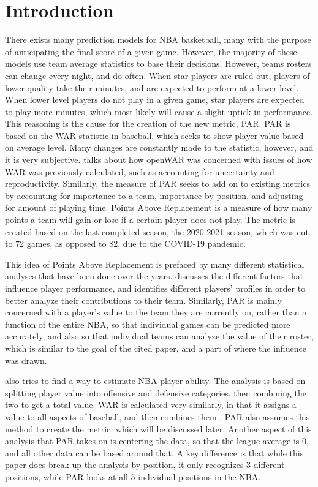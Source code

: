 \documentclass[12pt]{article}
\begin{document}
\section{Introduction}
There exists many prediction models for NBA basketball, many with the 
purpose of anticipating the final 
score of a given game. However, the majority of these models use team 
average statistics to base their 
decisions. However, 
teams rosters can change every night, and do often. When star players 
are ruled out, players of lower 
quality take their minutes, and are expected to perform at a lower level. 
When lower level players do not 
play in a given game, star players are expected to play more minutes, 
which most likely will cause a slight 
uptick in performance. This reasoning is the cause for the creation of the 
new metric, PAR. PAR is based on the WAR statistic in baseball, which 
seeks to show player value based on average level. Many changes are 
constantly made to the statistic, however, and it is very subjective. 
\citet{Baumer} talks about how openWAR was concerned with issues of 
how WAR was previously calculated, such as accounting for uncertainty 
and reproductivity. Similarly, the measure of PAR seeks to add on to 
existing metrics by accounting for importance to a team, importance by 
position, and adjusting for amount of playing time. Points Above 
Replacement is a measure of how many points a team will gain or lose if 
a certain player does not play. 
The metric is created based on the last completed season, the 2020-2021 
season, which was cut to 72 games, as opposed to 82, due to 
the COVID-19 pandemic.

This idea of Points Above Replacement is prefaced by many different 
statistical analyses that have been done over the years. \citet{Dehesa} 
discusses the different factors that influence player performance, and 
identifies different players' profiles in order to better analyze their 
contributions to their team. Similarly, PAR is mainly concerned with a 
player's value to the team they are currently on, rather than a function of 
the entire NBA, so that individual games can be predicted more 
accurately, and also so that individual teams can analyze the value of 
their roster, which is similar to the goal of the cited paper, and a part of 
where the influence was drawn.

\citet{Fearnhead} also tries to find a way to estimate NBA player ability. 
The analysis is based on splitting player value into offensive and 
defensive categories, then combining the two to get a total value. WAR is 
calculated very similarly, in that it assigns a value to all aspects of 
baseball, and then combines them \citep{BaseballWAR}. PAR also 
assumes this method to create the metric, which will be discussed later. 
Another aspect of this analysis that PAR takes on is centering the data, so 
that the league average is 0, and all other data can be based around that. 
A key difference is that while this paper does break up the analysis by 
position, it only recognizes 3 different positions, while PAR looks at all 5 
individual positions in the NBA.
\end{document}
